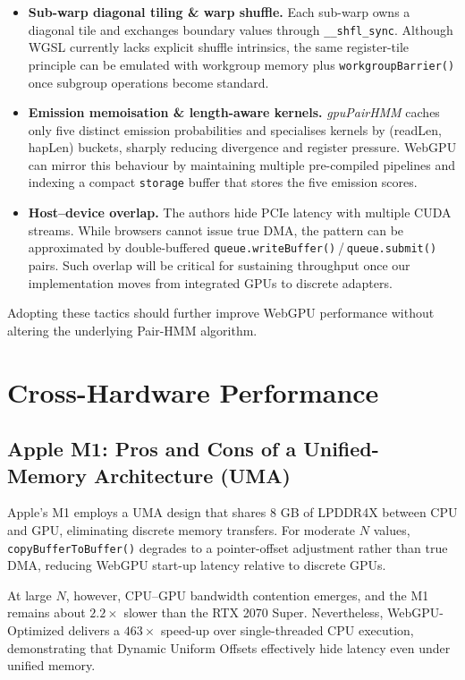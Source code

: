 \documentclass[PhD]{PHlab-thesis}
\begin{document}
\begin{itemize}
  \item \textbf{Sub-warp diagonal tiling \& warp shuffle.}  
        Each sub-warp owns a diagonal tile and exchanges boundary values through \texttt{\_\_shfl\_sync}.  
        Although WGSL currently lacks explicit shuffle intrinsics, the same register-tile principle can be emulated with workgroup memory plus \texttt{workgroupBarrier()} once subgroup operations become standard.
  \item \textbf{Emission memoisation \& length-aware kernels.}  
        \textit{gpuPairHMM} caches only five distinct emission probabilities and specialises kernels by (readLen, hapLen) buckets, sharply reducing divergence and register pressure.  
        WebGPU can mirror this behaviour by maintaining multiple pre-compiled pipelines and indexing a compact \texttt{storage} buffer that stores the five emission scores.
  \item \textbf{Host–device overlap.}  
        The authors hide PCIe latency with multiple CUDA streams.  
        While browsers cannot issue true DMA, the pattern can be approximated by double-buffered \texttt{queue.writeBuffer()} / \texttt{queue.submit()} pairs.  
        Such overlap will be critical for sustaining throughput once our implementation moves from integrated GPUs to discrete adapters.
\end{itemize}

Adopting these tactics should further improve WebGPU performance without altering the underlying Pair-HMM algorithm.


\section{Cross-Hardware Performance}

\subsection{Apple M1: Pros and Cons of a Unified-Memory Architecture (UMA)}
Apple’s M1 employs a UMA design that shares 8 GB of LPDDR4X between CPU and GPU, eliminating discrete memory transfers.  
For moderate $N$ values, \texttt{copyBufferToBuffer()} degrades to a pointer-offset adjustment rather than true DMA, reducing WebGPU start-up latency relative to discrete GPUs.

At large $N$, however, CPU–GPU bandwidth contention emerges, and the M1 remains about $2.2\times$ slower than the RTX 2070 Super.  
Nevertheless, WebGPU-Optimized delivers a $463\times$ speed-up over single-threaded CPU execution, demonstrating that Dynamic Uniform Offsets effectively hide latency even under unified memory.
\end{document}
